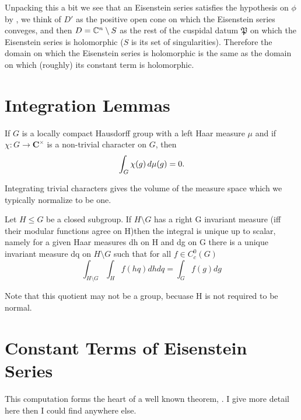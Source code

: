     Unpacking this a bit we see that an Eisenstein series satisfies the hypothesis on \(\phi\) by \cite[IV.1.9]{moeglinSpectralDecompositionEisenstein1995} , we think of \(D'\) as the positive open cone on which the Eisenstein series conveges, and then \(D = \C^n \setminus S \) as the rest of the cuspidal datum \(\mathfrak{P}\) on which the Eisenstein series is holomorphic (\(S\) is its set of singularities). Therefore the domain on which the Eisenstein series is holomorphic is the same as the domain on which (roughly) its constant term is holomorphic.

\section{Integration Lemmas}
\begin{Theorem}\label{integrate_unitary_char}
	If \(G\) is a locally compact Hausdorff group with a left Haar measure \(\mu\) and if \(\chi\colon G\to \mathbf C^\times\) is a non-trivial character on \(G\), then
	\[ \int^{}_{G}\chi(g)\,d\mu(g) = 0. \]
\end{Theorem}
    Integrating trivial characters gives the volume of the measure space which we typically normalize to be one.

\begin{Theorem}
        Let \(H\leq G\) be a closed subgroup. If \(H\setminus G\) has a right G invariant measure (iff their modular functions agree on H)then the integral is unique up to scalar, namely for a given Haar measures dh on H and dg on G there is a unique invariant measure dq on \(H\setminus G\) such that for all \(f\in C_c^0(G)\)
        \[\int_{H\setminus G}\int_H f(hq)dhdq = \int_G f(g) dg\]
    \end{Theorem}
    Note that this quotient may not be a group, becuase H is not required to be normal.

\section{Constant Terms of Eisenstein Series}
This computation forms the heart of a well known theorem, \cite[Prop 10.4.2]{getzIntroductionAutomorphicRepresentations2024}\cite[II.1.7]{moeglinSpectralDecompositionEisenstein1995}\cite[6.2]{shahidiEisensteinSeriesAutomorphic2010}. I give more detail here then I could find anywhere else. 

